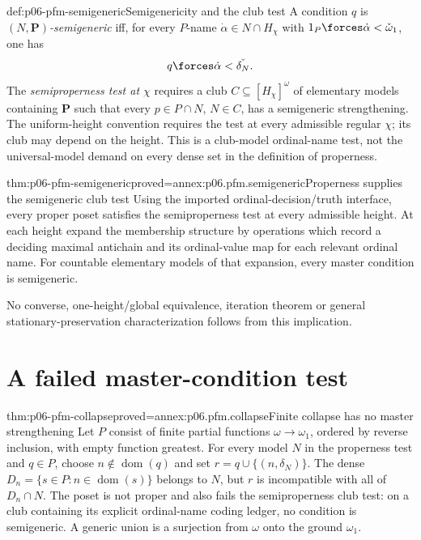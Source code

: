 \begin{hbdefinition}{def:p06-pfm-semigeneric}{Semigenericity and the club test}
A condition \(q\) is \emph{\((N,\mathbf P)\)-semigeneric} iff, for every
\(P\)-name \(\dot\alpha\in N\cap H_\chi\) with
\(1_P\forces\dot\alpha<\check\omega_1\), one has
\[
 q\forces\dot\alpha<\check{\delta_N}.
\]
The \emph{semiproperness test at \(\chi\)} requires a club
\(C\subseteq[H_\chi]^\omega\) of elementary models containing \(\mathbf P\)
such that every \(p\in P\cap N\), \(N\in C\), has a semigeneric
strengthening. The uniform-height convention requires the test at every
admissible regular \(\chi\); its club may depend on the height.
This is a club-model ordinal-name test, not the universal-model demand
on every dense set in the definition of properness.
\end{hbdefinition}

\begin{hbtheorem}{thm:p06-pfm-semigeneric}{proved=annex:p06.pfm.semigeneric}{Properness supplies the semigeneric club test}
Using the imported ordinal-decision/truth interface, every proper poset
satisfies the semiproperness test at every admissible height.
At each height expand the membership structure by operations which record
a deciding maximal antichain and its ordinal-value map for each relevant
ordinal name. For countable elementary models of that expansion, every
master condition is semigeneric.
\end{hbtheorem}

No converse, one-height/global equivalence, iteration theorem or general
stationary-preservation characterization follows from this implication.

\section{A failed master-condition test}
\label{sec:p06-pfm-failure}

\begin{hbtheorem}{thm:p06-pfm-collapse}{proved=annex:p06.pfm.collapse}{Finite collapse has no master strengthening}
Let \(P\) consist of finite partial functions \(\omega\to\omega_1\),
ordered by reverse inclusion, with empty function greatest.
For every model \(N\) in the properness test and \(q\in P\), choose
\(n\notin\operatorname{dom}(q)\) and set \(r=q\cup\{(n,\delta_N)\}\).
The dense \(D_n=\{s\in P:n\in\operatorname{dom}(s)\}\) belongs to \(N\),
but \(r\) is incompatible with all of \(D_n\cap N\).
The poset is not proper and also fails the semiproperness club test:
on a club containing its explicit ordinal-name coding ledger, no condition
is semigeneric. A generic union is a surjection from \(\omega\) onto the
ground \(\omega_1\).
\end{hbtheorem}

